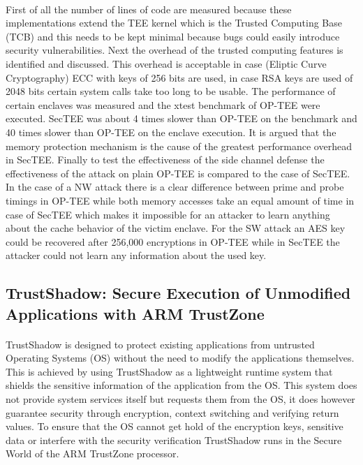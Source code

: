 \paragraph*{}
First of all the number of lines of code are measured because these implementations extend the TEE kernel which is the Trusted Computing Base (TCB) and this needs to be kept minimal because bugs could easily introduce security vulnerabilities. Next the overhead of the trusted computing features is identified and discussed. This overhead is acceptable in case (Eliptic Curve Cryptography) ECC with keys of 256 bits are used, in case RSA keys are used of 2048 bits certain system calls take too long to be usable. The performance of certain enclaves was measured and the xtest benchmark of OP-TEE were executed. SecTEE was about 4 times slower than OP-TEE on the benchmark and 40 times slower than OP-TEE on the enclave execution. It is argued that the memory protection mechanism is the cause of the greatest performance overhead in SecTEE. Finally to test the effectiveness of the side channel defense the effectiveness of the attack on plain OP-TEE is compared to the case of SecTEE. In the case of a NW attack there is a clear difference between prime and probe timings in OP-TEE while both memory accesses take an equal amount of time in case of SecTEE which makes it impossible for an attacker to learn anything about the cache behavior of the victim enclave. For the SW attack an AES key could be recovered after 256,000 encryptions in OP-TEE while in SecTEE the attacker could not learn any information about the used key.

\subsection*{TrustShadow: Secure Execution of Unmodified Applications with ARM TrustZone}

\paragraph*{}
TrustShadow \cite{GuanLe2017TSEo} is designed to protect existing applications from untrusted Operating Systems (OS) without the need to modify the applications themselves. This is achieved by using TrustShadow as a lightweight runtime system that shields the sensitive information of the application from the OS. This system does not provide system services itself but requests them from the OS, it does however guarantee security through encryption, context switching and verifying return values. To ensure that the OS cannot get hold of the encryption keys, sensitive data or interfere with the security verification TrustShadow runs in the Secure World of the ARM TrustZone processor.

